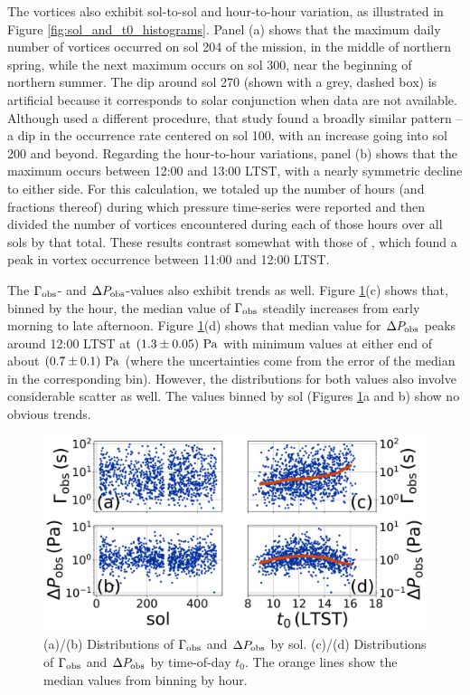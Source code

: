 \documentclass{aastex63}
\begin{document}
The vortices also exhibit sol-to-sol and hour-to-hour variation, as illustrated in Figure \ref{fig:sol_and_t0_histograms}. Panel (a) shows that the maximum daily number of vortices occurred on sol 204 of the mission, in the middle of northern spring, while the next maximum occurs on sol 300, near the beginning of northern summer. The dip around sol 270 (shown with a grey, dashed box) is artificial because it corresponds to solar conjunction when data are not available. Although \citet{Spiga2021} used a different procedure, that study found a broadly similar pattern -- a dip in the occurrence rate centered on sol 100, with an increase going into sol 200 and beyond. Regarding the hour-to-hour variations, panel (b) shows that the maximum occurs between 12:00 and 13:00 LTST, with a nearly symmetric decline to either side. For this calculation, we totaled up the number of hours (and fractions thereof) during which pressure time-series were reported and then divided the number of vortices encountered during each of those hours over all sols by that total. These results contrast somewhat with those of \citet{Spiga2021}, which found a peak in vortex occurrence between 11:00 and 12:00 LTST. 

The $\Gamma_{\rm obs}$- and $\Delta P_{\rm obs}$-values also exhibit trends as well. Figure \ref{fig:Gammaobs_DeltaPobs_vs_TOD_and_sol}(c) shows that, binned by the hour, the median value of $\Gamma_{\rm obs}$ steadily increases from early morning to late afternoon. Figure \ref{fig:Gammaobs_DeltaPobs_vs_TOD_and_sol}(d) shows that median value for $\Delta P_{\rm obs}$ peaks around 12:00 LTST at $\left( 1.3\pm0.05 \right)\,{\rm Pa}$ with minimum values at either end of about $\left( 0.7\pm 0.1 \right)\,{\rm Pa}$ (where the uncertainties come from the error of the median in the corresponding bin). However, the distributions for both values also involve considerable scatter as well. The values binned by sol (Figures \ref{fig:Gammaobs_DeltaPobs_vs_TOD_and_sol}a and b) show no obvious trends. 

\begin{figure}
    \centering
    \includegraphics[width=\textwidth]{figures/Gammaobs_DeltaPobs_vs_TOD_and_sol.png}
    \caption{(a)/(b) Distributions of $\Gamma_{\rm obs}$ and $\Delta P_{\rm obs}$ by sol. (c)/(d) Distributions of $\Gamma_{\rm obs}$ and $\Delta P_{\rm obs}$ by time-of-day $t_0$. The orange lines show the median values from binning by hour.}
    \label{fig:Gammaobs_DeltaPobs_vs_TOD_and_sol}
\end{figure}
\end{document}
